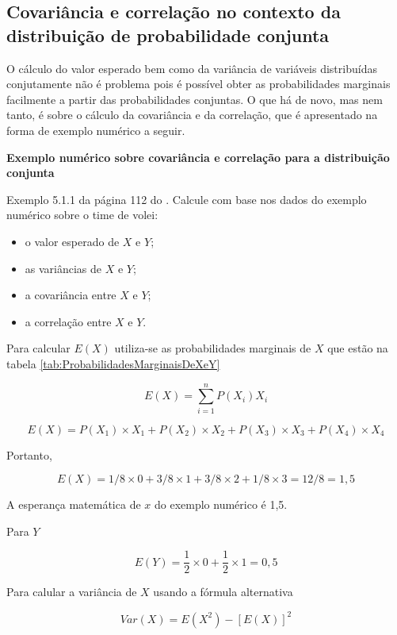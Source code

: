 \documentclass[
]{book}
\providecommand{\tightlist}{%
  \setlength{\itemsep}{0pt}\setlength{\parskip}{0pt}}
\begin{document}
\hypertarget{covariuxe2ncia-e-correlauxe7uxe3o-no-contexto-da-distribuiuxe7uxe3o-de-probabilidade-conjunta}{%
\subsection{Covariância e correlação no contexto da distribuição de probabilidade conjunta}\label{covariuxe2ncia-e-correlauxe7uxe3o-no-contexto-da-distribuiuxe7uxe3o-de-probabilidade-conjunta}}

O cálculo do valor esperado bem como da variância de variáveis distribuídas conjutamente não é problema pois é possível obter as probabilidades marginais facilmente a partir das probabilidades conjuntas. O que há de novo, mas nem tanto, é sobre o cálculo da covariância e da correlação, que é apresentado na forma de exemplo numérico a seguir.

\textbf{Exemplo numérico sobre covariância e correlação para a distribuição conjunta}

Exemplo 5.1.1 da página 112 do \citet{Sartoris2013}. Calcule com base nos dados do exemplo numérico sobre o time de volei:

\begin{itemize}
\tightlist
\item
  o valor esperado de \(X\) e \(Y\);
\item
  as variâncias de \(X\) e \(Y\);
\item
  a covariância entre \(X\) e \(Y\);
\item
  a correlação entre \(X\) e \(Y\).
\end{itemize}

Para calcular \(E(X)\) utiliza-se as probabilidades marginais de \(X\) que estão na tabela \ref{tab:ProbabilidadesMarginaisDeXeY}

\[
E(X) = \sum_{i=1}^{n}P(X_i)X_i
\]

\[
E(X) =  P(X_1)\times X_1 + P(X_2)\times X_2 + P(X_3)\times X_3 + P(X_4)\times X_4
\]

Portanto,

\[
E(X) =  1/8\times 0 + 3/8\times 1  + 3/8\times 2 + 1/8\times 3 = 12/8 = 1,5
\]

A esperança matemática de \(x\) do exemplo numérico é 1,5.

Para \(Y\)

\[
  E(Y) = \frac{1}{2}\times 0 + \frac{1}{2} \times 1 = 0,5
\]

Para calular a variância de \(X\) usando a fórmula alternativa

\[
Var(X) = E(X^2) - [E(X)]^2
\]
\end{document}
